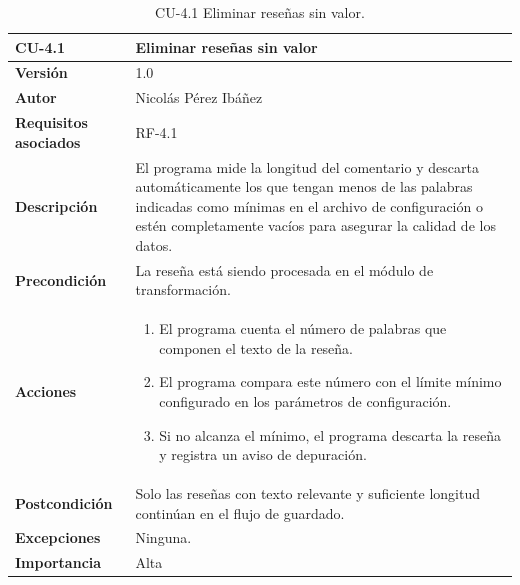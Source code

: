 \begin{table}[p]
	\centering
	\begin{tabularx}{\linewidth}{ p{} p{} }
		\toprule
		\textbf{CU-4.1}  & \textbf{Eliminar reseñas sin valor}\\
		\toprule
		\textbf{Versión}              & 1.0    \\
		\textbf{Autor}                & Nicolás Pérez Ibáñez \\
		\textbf{Requisitos asociados} & RF-4.1 \\
		\textbf{Descripción}          & El programa mide la longitud del comentario y descarta automáticamente los que tengan menos de las palabras indicadas como mínimas en el archivo de configuración o estén completamente vacíos para asegurar la calidad de los datos. \\
		\textbf{Precondición}         & La reseña está siendo procesada en el módulo de transformación. \\
		\textbf{Acciones}             &
		\begin{enumerate}
			\def\labelenumi{\arabic{enumi}.}
			\tightlist
			\item El programa cuenta el número de palabras que componen el texto de la reseña.
			\item El programa compara este número con el límite mínimo configurado en los parámetros de configuración.
			\item Si no alcanza el mínimo, el programa descarta la reseña y registra un aviso de depuración.
		\end{enumerate}\\
		\textbf{Postcondición}        & Solo las reseñas con texto relevante y suficiente longitud continúan en el flujo de guardado. \\
		\textbf{Excepciones}          & Ninguna. \\
		\textbf{Importancia}          & Alta \\
		\bottomrule
	\end{tabularx}
	\caption{CU-4.1 Eliminar reseñas sin valor.}
\end{table}

